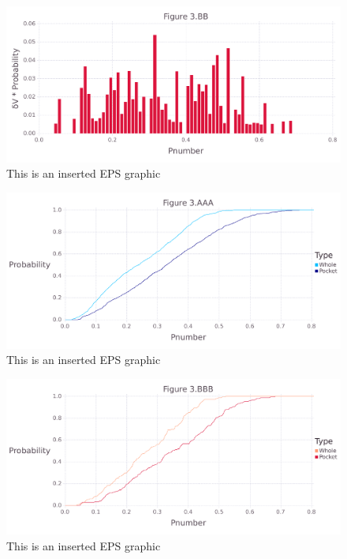 \documentclass[10pt,letterpaper]{article}
\begin{document}
\begin{figure}[ht]
\begin{center}
\includegraphics[scale=0.5]{1hvr_apo/3bbfigure.pdf}
\caption{This is an inserted EPS graphic}
\label{fig11}
\end{center}
\end{figure}

\begin{figure}[ht]
\begin{center}
\includegraphics[scale=0.5]{1hvr_apo/3aaafigure.pdf}
\caption{This is an inserted EPS graphic}
\label{fig9}
\end{center}
\end{figure}

\begin{figure}[ht]
\begin{center}
\includegraphics[scale=0.5]{1hvr_apo/3bbbfigure.pdf}
\caption{This is an inserted EPS graphic}
\label{fig12}
\end{center}
\end{figure}
\end{document}
